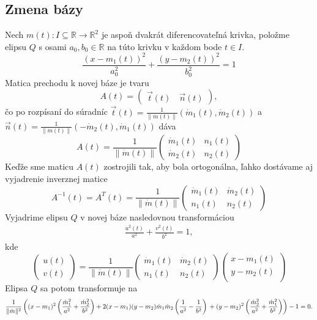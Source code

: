 \subsection{Zmena bázy}
Nech $m(t) \colon  I \subseteq \mathbb{R} \rightarrow \mathbb{R}^2$ je aspoň dvakrát diferencovateľná krivka, položme elipsu $Q$ s osami $a_0, b_0 \in \mathbb{R}$ na túto krivku v každom bode $t \in I.$
\begin{equation*}
\frac{{(x - m_1(t))^2}}{a_0^2} + \frac{{(y - m_2(t))^2}}{b_0^2} = 1
\end{equation*}
Matica prechodu k novej báze je tvaru
$$
A(t) = \left(\begin{matrix} \vec{t}(t) \quad \vec{n}(t)
\end{matrix} \right),
$$
čo po rozpísaní do súradníc $\vec{t}(t) = \frac{1}{ \| \dot{m}(t) \|}( \dot{m}_1(t),  \dot{m}_2(t))$ a $\vec{n}(t) = \frac{1}{ \| \dot{m}(t) \|}( -\dot{m}_2(t),  \dot{m}_1(t))$ dáva 
$$
A(t) = \frac{1}{ \| \dot{m}(t) \|} \left(\begin{matrix}
   \dot{m}_1(t) & n_1(t) \\
   \dot{m}_2(t) & n_2(t)
\end{matrix} \right)
$$
Keďže sme maticu $A(t)$ zostrojili tak, aby bola ortogonálna, ľahko dostávame aj vyjadrenie inverznej matice
$$
A^{-1}(t) = A^{T}(t) = \frac{1}{ \| \dot{m}(t) \|} \left(\begin{matrix}
  \dot{m}_1(t) & \dot{m}_2(t) \\
    n_1(t) & n_2(t)
\end{matrix}\right)
$$
Vyjadrime elipsu $Q$ v novej báze nasledovnou transformáciou
\begin{align*}
\frac{u^2(t)}{a^2} + \frac{v^2(t)}{b^2} = 1,
\end{align*}
kde 
$$
\left(\begin{matrix}
u(t) \\
v(t)
\end{matrix}\right) = \frac{1}{ \| \dot{m}(t) \|}
\left(\begin{matrix}
  \dot{m}_1(t) & \dot{m}_2(t) \\
    n_1(t) & n_2(t)
\end{matrix}\right)
\left(\begin{matrix}
x-m_1(t) \\
y-m_2(t) \\
\end{matrix}\right)
$$
Elipsa $Q$ sa potom transformuje na 
\begin{equation} 
\label{eq:elipsa_v_novej_baze}
\frac{1}{\|\dot{m}\|^2} \left( (x - m_1)^2 \left( \frac{{\dot{m}_1}^2}{a^2} + \frac{{\dot{m}_2}^2}{b^2} \right) + 2(x - m_1)(y - m_2)\dot{m}_1\dot{m}_2 \left( \frac{1}{a^2} - \frac{1}{b^2} \right) \\
+ (y - m_2)^2 \left( \frac{{\dot{m}_2}^2}{a^2} + \frac{{\dot{m}_1}^2}{b^2} \right) \right) - 1 = 0.
\end{equation}
